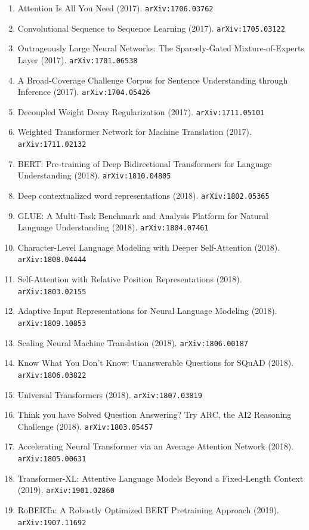 \documentclass[11pt]{article}
\begin{document}
\begin{enumerate}
  \item Attention Is All You Need (2017). \texttt{arXiv:1706.03762}
  \item Convolutional Sequence to Sequence Learning (2017). \texttt{arXiv:1705.03122}
  \item Outrageously Large Neural Networks: The Sparsely-Gated
  Mixture-of-Experts Layer (2017). \texttt{arXiv:1701.06538}
  \item A Broad-Coverage Challenge Corpus for Sentence Understanding through
  Inference (2017). \texttt{arXiv:1704.05426}
  \item Decoupled Weight Decay Regularization (2017). \texttt{arXiv:1711.05101}
  \item Weighted Transformer Network for Machine Translation (2017). \texttt{arXiv:1711.02132}
  \item BERT: Pre-training of Deep Bidirectional Transformers for Language
  Understanding (2018). \texttt{arXiv:1810.04805}
  \item Deep contextualized word representations (2018). \texttt{arXiv:1802.05365}
  \item GLUE: A Multi-Task Benchmark and Analysis Platform for Natural Language
  Understanding (2018). \texttt{arXiv:1804.07461}
  \item Character-Level Language Modeling with Deeper Self-Attention (2018). \texttt{arXiv:1808.04444}
  \item Self-Attention with Relative Position Representations (2018). \texttt{arXiv:1803.02155}
  \item Adaptive Input Representations for Neural Language Modeling (2018). \texttt{arXiv:1809.10853}
  \item Scaling Neural Machine Translation (2018). \texttt{arXiv:1806.00187}
  \item Know What You Don't Know: Unanswerable Questions for SQuAD (2018). \texttt{arXiv:1806.03822}
  \item Universal Transformers (2018). \texttt{arXiv:1807.03819}
  \item Think you have Solved Question Answering? Try ARC, the AI2 Reasoning
  Challenge (2018). \texttt{arXiv:1803.05457}
  \item Accelerating Neural Transformer via an Average Attention Network (2018). \texttt{arXiv:1805.00631}
  \item Transformer-XL: Attentive Language Models Beyond a Fixed-Length Context (2019). \texttt{arXiv:1901.02860}
  \item RoBERTa: A Robustly Optimized BERT Pretraining Approach (2019). \texttt{arXiv:1907.11692}

\end{enumerate}
\end{document}
